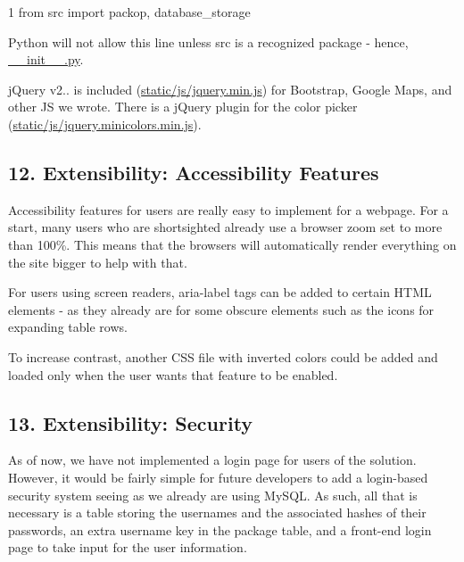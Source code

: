 \begin{DoxyCode}
1 from src import packop, database\_storage
\end{DoxyCode}


Python will not allow this line unless {\ttfamily src} is a recognized package -\/ hence, {\ttfamily \hyperlink{____init_____8py}{\+\_\+\+\_\+init\+\_\+\+\_\+.\+py}}.

j\+Query v2.. is included ({\ttfamily \hyperlink{jquery_8min_8js}{static/js/jquery.\+min.\+js}}) for Bootstrap, Google Maps, and other JS we wrote. There is a j\+Query plugin for the color picker ({\ttfamily \hyperlink{jquery_8minicolors_8min_8js}{static/js/jquery.\+minicolors.\+min.\+js}}).

\subsection*{12. Extensibility\+: Accessibility Features}

Accessibility features for users are really easy to implement for a webpage. For a start, many users who are shortsighted already use a browser zoom set to more than 100\%. This means that the browsers will automatically render everything on the site bigger to help with that.

For users using screen readers, {\ttfamily aria-\/label} tags can be added to certain H\+T\+ML elements -\/ as they already are for some obscure elements such as the icons for expanding table rows.

To increase contrast, another C\+SS file with inverted colors could be added and loaded only when the user wants that feature to be enabled.

\subsection*{13. Extensibility\+: Security}

As of now, we have not implemented a login page for users of the solution. However, it would be fairly simple for future developers to add a login-\/based security system seeing as we already are using My\+S\+QL. As such, all that is necessary is a table storing the usernames and the associated hashes of their passwords, an extra username key in the package table, and a front-\/end login page to take input for the user information. 